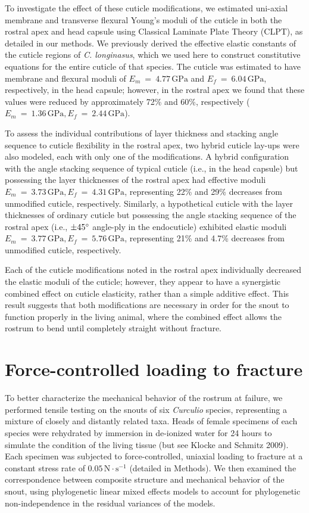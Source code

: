 \documentclass[twocolumn, linenumbers, superscriptaddress]{revtex4-1}
\begin{document}
		To investigate the effect of these cuticle modifications, we estimated uni-axial membrane and transverse flexural Young's moduli of the cuticle in both the rostral apex and head capsule using Classical Laminate Plate Theory (CLPT), as detailed in our methods.
		We previously derived the effective elastic constants of the cuticle regions of \textit{C. longinasus}, which we used here to construct constitutive equations for the entire cuticle of that species.
		The cuticle was estimated to have membrane and flexural moduli of $E_m~=~4.77\,\text{GPa}$ and $E_f~=~6.04\,\text{GPa}$, respectively, in the head capsule; however, in the rostral apex we found that these values were reduced by approximately 72\% and 60\%, respectively ($E_m~=~1.36\,\text{GPa}, E_f~=~2.44\,\text{GPa}$).
		
		To assess the individual contributions of layer thickness and stacking angle sequence to cuticle flexibility in the rostral apex, two hybrid cuticle lay-ups were also modeled, each with only one of the modifications.
		A hybrid configuration with the angle stacking sequence of typical cuticle (i.e., in the head capsule) but possessing the layer thicknesses of the rostral apex had effective moduli $E_m~=~3.73\,\text{GPa}, E_f~=~4.31\,\text{GPa}$, representing 22\% and 29\% decreases from unmodified cuticle, respectively.
		Similarly, a hypothetical cuticle with the layer thicknesses of ordinary cuticle but possessing the angle stacking sequence of the rostral apex (i.e., $\pm45\degree$ angle-ply in the endocuticle) exhibited elastic moduli $E_m~=~3.77\,\text{GPa}, E_f~=~5.76\,\text{GPa}$, representing 21\% and 4.7\% decreases from unmodified cuticle, respectively.
		
		
		Each of the cuticle modifications noted in the rostral apex individually decreased the elastic moduli of the cuticle; however, they appear to have a synergistic combined effect on cuticle elasticity, rather than a simple additive effect.
		This result suggests that both modifications are necessary in order for the snout to function properly in the living animal, where the combined effect allows the rostrum to bend until completely straight without fracture.
		
	\section{Force-controlled loading to fracture}
	
		To better characterize the mechanical behavior of the rostrum at failure, we performed tensile testing on the snouts of six \textit{Curculio} species, representing a mixture of closely and distantly related taxa.
		Heads of female specimens of each species were rehydrated by immersion in de-ionized water for 24 hours to simulate the condition of the living tissue (but see Klocke and Schmitz 2009).
		Each specimen was subjected to force-controlled, uniaxial loading to fracture at a constant stress rate of $0.05\,\text{N}\cdot\text{s}^{-1}$ (detailed in Methods).
		We then examined the correspondence between composite structure and mechanical behavior of the snout, using phylogenetic linear mixed effects models to account for phylogenetic non-independence in the residual variances of the models.
\end{document}
